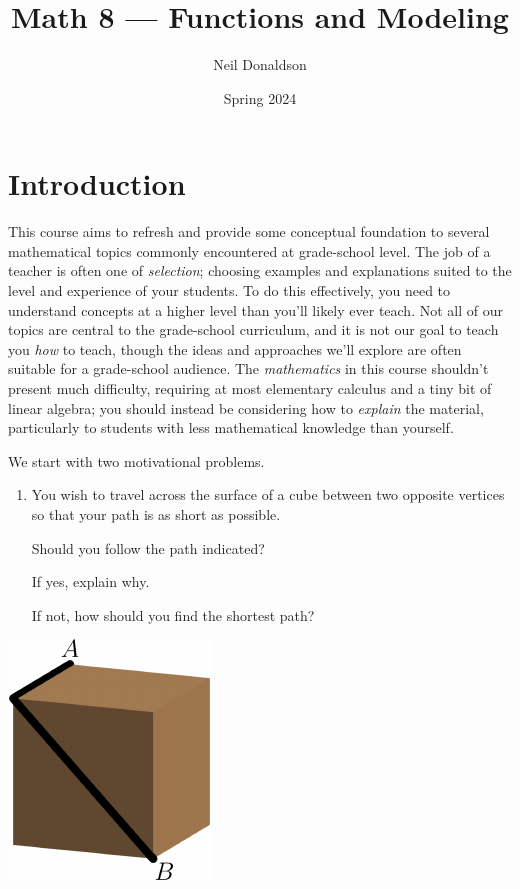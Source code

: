 \graphicspath{{1functions/asy/}}
\thispagestyle{empty}

\title{Math 8 --- Functions and Modeling}
\author{Neil Donaldson}
\date{Spring 2024}
\maketitle	

\section*{Introduction}

This course aims to refresh and provide some conceptual foundation to several mathematical topics commonly encountered at grade-school level. The job of a teacher is often one of \emph{selection}; choosing examples and explanations suited to the level and experience of your students. To do this effectively, you need to understand concepts at a higher level than you'll likely ever teach. Not all of our topics are central to the grade-school curriculum, and it is not our goal to teach you \emph{how} to teach, though the ideas and approaches we'll explore are often suitable for a grade-school audience. The \emph{mathematics} in this course shouldn't present much difficulty, requiring at most elementary calculus and a tiny bit of linear algebra; you should instead be considering how to \emph{explain} the material, particularly to students with less mathematical knowledge than yourself.\par

\begin{minipage}[t]{0.72\linewidth}\vspace{0pt}
	We start with two motivational problems.\footnotemark
	\begin{enumerate}
	  \item You wish to travel across the surface of a cube between two opposite vertices so that your path is as short as possible.\par
	  Should you follow the path indicated?\par
	  If yes, explain why.\par
	  If not, how should you find the shortest path?
	\end{enumerate}
\end{minipage}
\hfill
\begin{minipage}[t]{0.25\linewidth}\vspace{-10pt}
	\flushright
	\includegraphics{intro-cube_0}
\end{minipage}
\smallbreak

